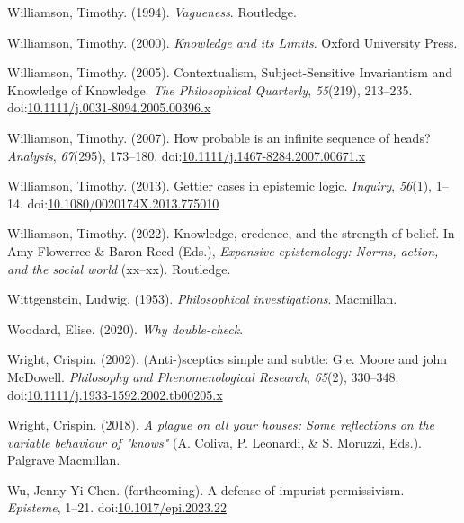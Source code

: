 \documentclass[
  10pt,
  letterpaper,
  twoside]{scrbook}
\newlength{\cslhangindent}
\newenvironment{CSLReferences}[2] %
 {\begin{list}{}{%
  \setlength{\itemindent}{0pt}
  \setlength{\leftmargin}{0pt}
  \setlength{\parsep}{0pt}
  \ifodd #1
   \setlength{\leftmargin}{\cslhangindent}
   \setlength{\itemindent}{-1\cslhangindent}
  \fi
  \setlength{\itemsep}{#2\baselineskip}}}
 {\end{list}}
\begin{document}
\begin{CSLReferences}{1}{0}
Williamson, Timothy. (1994). \emph{{Vagueness}}. Routledge.

Williamson, Timothy. (2000). \emph{{Knowledge and its Limits}}. Oxford
University Press.

Williamson, Timothy. (2005). {Contextualism, Subject-Sensitive
Invariantism and Knowledge of Knowledge}. \emph{The Philosophical
Quarterly}, \emph{55}(219), 213--235.
doi:\href{https://doi.org/10.1111/j.0031-8094.2005.00396.x}{10.1111/j.0031-8094.2005.00396.x}

Williamson, Timothy. (2007). How probable is an infinite sequence of
heads? \emph{Analysis}, \emph{67}(295), 173--180.
doi:\href{https://doi.org/10.1111/j.1467-8284.2007.00671.x}{10.1111/j.1467-8284.2007.00671.x}

Williamson, Timothy. (2013). Gettier cases in epistemic logic.
\emph{Inquiry}, \emph{56}(1), 1--14.
doi:\href{https://doi.org/10.1080/0020174X.2013.775010}{10.1080/0020174X.2013.775010}

Williamson, Timothy. (2022). Knowledge, credence, and the strength of
belief. In Amy Flowerree \& Baron Reed (Eds.), \emph{Expansive
epistemology: Norms, action, and the social world} (xx--xx). Routledge.

Wittgenstein, Ludwig. (1953). \emph{Philosophical investigations}.
Macmillan.

Woodard, Elise. (2020). \emph{Why double-check}.

Wright, Crispin. (2002). (Anti-)sceptics simple and subtle: G.e. Moore
and john McDowell. \emph{Philosophy and Phenomenological Research},
\emph{65}(2), 330--348.
doi:\href{https://doi.org/10.1111/j.1933-1592.2002.tb00205.x}{10.1111/j.1933-1592.2002.tb00205.x}

Wright, Crispin. (2018). \emph{A plague on all your houses: Some
reflections on the variable behaviour of "knows"} (A. Coliva, P.
Leonardi, \& S. Moruzzi, Eds.). Palgrave Macmillan.

Wu, Jenny Yi-Chen. (forthcoming). A defense of impurist permissivism.
\emph{Episteme}, 1--21.
doi:\href{https://doi.org/10.1017/epi.2023.22}{10.1017/epi.2023.22}


\end{CSLReferences}
\end{document}
